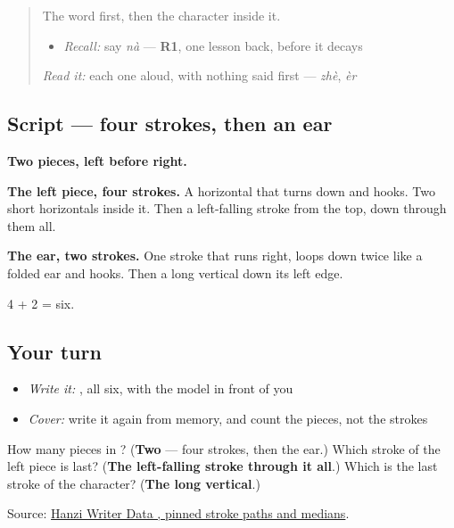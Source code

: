 \label{lesson:ZH-W37-na}



\begin{quote}
The word first, then the character inside it.

\begin{itemize}
\raggedright
  \item \emph{Recall:} say \emph{nà} — \textbf{R1}, one lesson back, before it decays
\end{itemize}

\begin{quote}
 
\end{quote}

\emph{Read it:} each one aloud, with nothing said first — \emph{zhè}, \emph{èr}
\end{quote}

\subsection*{Script — four strokes, then an ear}

\begin{quote}
\end{quote}

\textbf{Two pieces, left before right.}

\textbf{The left piece, four strokes.} A horizontal that turns down and hooks. Two short horizontals inside it. Then a left-falling stroke from the top, down through them all.

\textbf{The ear, two strokes.} One stroke that runs right, loops down twice like a folded ear and hooks. Then a long vertical down its left edge.

4 + 2 = six.

\subsection*{Your turn}
\begin{itemize}
\raggedright
  \item \emph{Write it:} , all six, with the model in front of you
  \item \emph{Cover:} write it again from memory, and count the pieces, not the strokes
\end{itemize}

\begin{tcolorbox}[breakable,colback=teal!4,colframe=teal!35!black,title={Before you move on}]
How many pieces in ? (\textbf{Two} — four strokes, then the ear.) Which stroke of the left piece is last? (\textbf{The left-falling stroke through it all}.) Which is the last stroke of the character? (\textbf{The long vertical}.)

Source: \href{https://raw.githubusercontent.com/chanind/hanzi-writer-data/68d10a4b21150cae5e1ebbd223eed289cf32d90c/data/\%E9\%82\%A3.json}{Hanzi Writer Data , pinned stroke paths and medians}.
\end{tcolorbox}
